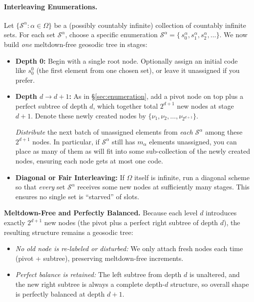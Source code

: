 \documentclass[acmsmall]{acmart}
\theoremstyle{definition}
\theoremstyle{remark}
\begin{document}
\paragraph{Interleaving Enumerations.}
Let $\{\mathcal{S}^\alpha : \alpha \in \Omega\}$ be a (possibly countably infinite) 
collection of countably infinite sets. For each set $\mathcal{S}^\alpha$, 
choose a specific enumeration 
$\mathcal{S}^\alpha = \{\,s^\alpha_0, s^\alpha_1, s^\alpha_2, \dots \}$. 
We now build \emph{one} meltdown-free geosodic tree in stages:

\begin{itemize}
    \item \textbf{Depth 0:} 
    Begin with a single root node. Optionally assign an initial code like $s^0_0$ 
    (the first element from one chosen set), or leave it unassigned if you prefer.

    \item \textbf{Depth $d \to d+1$:} 
    As in \S\ref{sec:enumeration}, add a pivot node on top plus a perfect subtree of depth $d$, 
    which together total $2^{d+1}$ new nodes at stage $d+1$. 
    Denote these newly created nodes by $\{\nu_1, \nu_2, \dots, \nu_{2^{d+1}}\}$.

    \emph{Distribute} the next batch of unassigned elements from \emph{each} $\mathcal{S}^\alpha$ 
    among these $2^{d+1}$ nodes. In particular, if $\mathcal{S}^\alpha$ still has 
    $m_\alpha$ elements unassigned, you can place as many of them as will fit 
    into some sub-collection of the newly created nodes, ensuring each node gets at most one code. 

    \item \textbf{Diagonal or Fair Interleaving:} 
    If $\Omega$ itself is infinite, run a diagonal scheme so that \emph{every} set $\mathcal{S}^\alpha$ 
    receives some new nodes at sufficiently many stages. This ensures no single set 
    is “starved” of slots. 
\end{itemize}

\noindent
\textbf{Meltdown-Free and Perfectly Balanced.}
Because each level $d$ introduces exactly $2^{d+1}$ new nodes (the pivot plus a perfect right subtree of depth $d$),
the resulting structure remains a geosodic tree:
\begin{itemize}
    \item \emph{No old node is re-labeled or disturbed:} We only attach fresh nodes 
    each time (pivot + subtree), preserving meltdown-free increments.
    \item \emph{Perfect balance is retained:} The left subtree from depth $d$ 
    is unaltered, and the new right subtree is always a complete depth-$d$ structure, 
    so overall shape is perfectly balanced at depth $d+1$.
\end{itemize}
\end{document}
